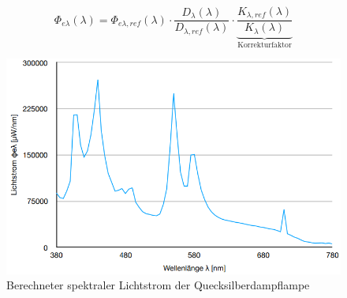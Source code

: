 \begin{equation}
\Phi_{e\lambda}(\lambda) = \Phi_{e\lambda,ref}(\lambda)\cdot \frac{D_{\lambda}(\lambda)}{D_{\lambda,ref}(\lambda)} \cdot \underbrace{\frac{K_{\lambda,ref}(\lambda)}{K_{\lambda}(\lambda)}}_{\mbox{Korrekturfaktor}}
\end{equation}

\begin{figure}[h]
	\centering
	\includegraphics[scale=0.4]{Images/V2_Lichtstrom.png}
	\caption{Berechneter spektraler Lichtstrom der Quecksilberdampflampe}
	\label{V2_STROM}
\end{figure}